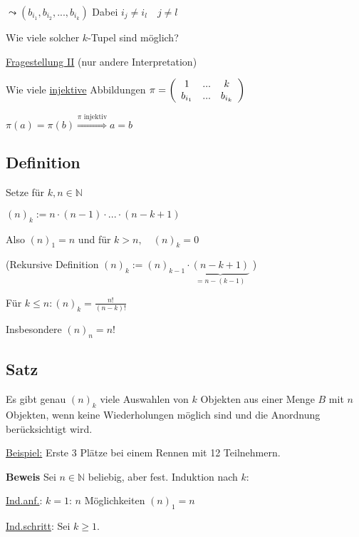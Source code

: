 \documentclass[a4paper, 12pt, twoside] {article}
\begin{document}
$\leadsto (b_{i_1}, b_{i_2},...,b_{i_k})$ Dabei $i_j \neq i_l \quad j \neq l$


Wie viele solcher $k$-Tupel sind möglich?

\underline{Fragestellung II} (nur andere Interpretation)

Wie viele \uline{injektive} Abbildungen  $\pi = \left( \begin{array}{c c c}
1 & ... & k \\
b_{i_1} & ... & b_{i_k}
\end{array} \right)$

$\pi(a) = \pi(b) \overset{\pi \text{ injektiv}}{\Rightarrow} a = b$

\subsection{Definition} %

Setze für $k,n \in \mathbb{N}$

$(n)_k := n \cdot (n-1) \cdot ... \cdot (n-k+1)$

Also $(n)_1 = n$ und für $k > n, \quad (n)_k = 0$

(Rekursive Definition $(n)_k := (n)_{k-1} \cdot \underbrace{(n-k+1)}_{=n-(k-1)}$ )

Für $k \leq n : (n)_k = \frac{n!}{(n-k)!}$

Insbesondere $(n)_n = n!$

\subsection{Satz} %

Es gibt genau $(n)_k$ viele Auswahlen von $k$ Objekten aus einer Menge $B$ mit $n$ Objekten, wenn keine Wiederholungen möglich sind und die Anordnung berücksichtigt wird.

\uline{Beispiel:} Erste 3 Plätze bei einem Rennen mit 12 Teilnehmern.



\textbf{Beweis} Sei $n \in \mathbb{N}$ beliebig, aber fest. Induktion nach $k$:

\uline{Ind.anf.}: $k=1$: $n$ Möglichkeiten $(n)_1 = n$ \checkmark

\uline{Ind.schritt}: Sei $k \geq 1$.
\end{document}
